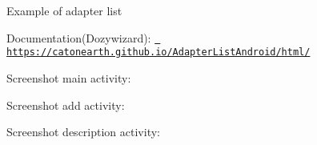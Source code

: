Example of adapter list

Documentation(\+Dozywizard)\+: \href{https://catonearth.github.io/AdapterListAndroid/html/}{\texttt{ https\+://catonearth.\+github.\+io/\+Adapter\+List\+Android/html/}}

Screenshot main activity\+: ~\newline
 

 

Screenshot add activity\+: ~\newline
 

 

Screenshot description activity\+: ~\newline
 

 